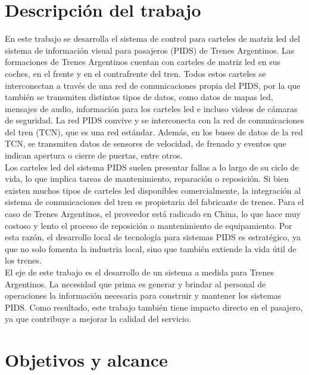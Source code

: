 \section{Descripción del trabajo}

En este trabajo se desarrolla el sistema de control para carteles de matriz led del sistema de información visual para pasajeros (PIDS) de Trenes Argentinos. Las formaciones de Trenes Argentinos cuentan con carteles de matriz led en sus coches, en el frente y en el contrafrente del tren. Todos estos carteles se interconectan a través de una red de comunicaciones propia del PIDS, por la que también se transmiten distintos tipos de datos, como datos de mapas led, mensajes de audio, información para los carteles led e incluso videos de cámaras de seguridad. La red PIDS convive y se interconecta con la red de comunicaciones del tren (TCN), que es una red estándar. Además, en los buses de datos de la red TCN, se transmiten datos de sensores de velocidad, de frenado y eventos que indican apertura o cierre de puertas, entre otros. \\

Los carteles led del sistema PIDS suelen presentar fallas a lo largo de su ciclo de vida, lo que implica tareas de mantenimiento, reparación o reposición. Si bien existen muchos tipos de carteles led disponibles comercialmente, la integración al sistema de comunicaciones del tren es propietaria del fabricante de trenes. Para el caso de Trenes Argentinos, el proveedor está radicado en China, lo que hace muy costoso y lento el proceso de reposición o mantenimiento de equipamiento. Por esta razón, el desarrollo local de tecnología para sistemas PIDS es estratégico, ya que no solo fomenta la industria local, sino que también extiende la vida útil de los trenes.\\


El eje de este trabajo es el desarrollo de un sistema a medida para Trenes Argentinos. La necesidad que prima es generar y brindar al personal de operaciones la información necesaria para construir y mantener los sistemas PIDS. Como resultado, este trabajo también tiene impacto directo en el pasajero, ya que contribuye a mejorar la calidad del servicio.\\


\section{Objetivos y alcance}

